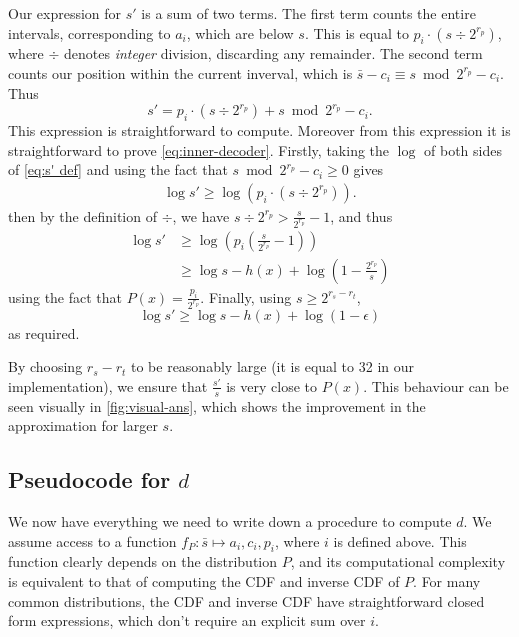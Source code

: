 \documentclass{article}
\begin{document}
Our expression for \(s'\) is a sum of two terms. The first term counts the
entire intervals, corresponding to \(a_i\), which are below \(s\). This is
equal to \(p_i \cdot (s \div 2^{r_p})\), where \(\div\) denotes \emph{integer}
division, discarding any remainder. The second term counts our position within
the current inverval, which is \(\bar s - c_i \equiv s\bmod 2^{r_p} - c_i\).
Thus
\begin{equation}\label{eq:s' def}
  s' = p_i \cdot (s \div 2^{r_p}) + s\bmod 2^{r_p} - c_i.
\end{equation}
This expression is straightforward to compute. Moreover from this expression it
is straightforward to prove \cref{eq:inner-decoder}. Firstly, taking the
\(\log\) of both sides of \cref{eq:s' def} and using the fact that \(s\bmod
2^{r_p} - c_i \geq 0\) gives
\begin{align}
  \log s' \geq \log (p_i\cdot (s\div 2^{r_p})).
\end{align}
then by the definition of \(\div\), we have \(s\div 2^{r_p} > \frac{s}{2^{r_p}}
- 1\), and thus
\begin{align}
  \log s'
    &\geq \log\left(p_i\left(\frac{s}{2^{r_p}} -1\right)\right)\\
    &\geq \log s - h(x) + \log\left(1 - \frac{2^{r_p}}{s}\right)
\end{align}
using the fact that \(P(x) = \frac{p_i}{2^{r_p}}\). Finally, using \(s \geq
2^{r_s - r_t}\),
\begin{equation}
  \log s' \geq \log s - h(x) + \log (1 - \epsilon)
\end{equation}
as required.

By choosing \(r_s - r_t\) to be reasonably
large (it is equal to 32 in our implementation), we ensure that
\(\frac{s'}{s}\) is very close to \(P(x)\). This behaviour can be seen visually
in \cref{fig:visual-ans}, which shows the improvement in the approximation for
larger \(s\).

\subsection{Pseudocode for \(d\)}
We now have everything we need to write down a procedure to compute \(d\). We
assume access to a function \(f_P:\bar{s}\mapsto a_i, c_i, p_i\), where \(i\)
is defined above. This function clearly depends on the distribution \(P\), and
its computational complexity is equivalent to that of computing the CDF and
inverse CDF of \(P\). For many common distributions, the CDF and inverse CDF
have straightforward closed form expressions, which don't require an explicit
sum over \(i\).
\end{document}
